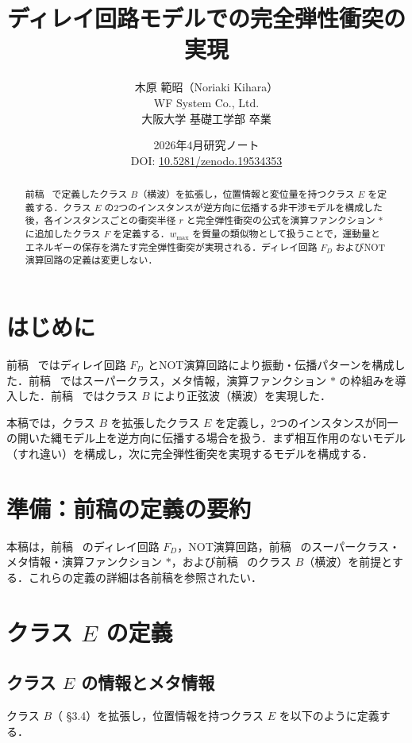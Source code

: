\documentclass[12pt,a4paper]{ltjsarticle}
\title{ディレイ回路モデルでの完全弾性衝突の実現}
\author{木原 範昭（Noriaki Kihara）\\
WF System Co., Ltd.\\
大阪大学 基礎工学部 卒業}
\date{2026年4月\quad 研究ノート\\[4pt]
DOI: \href{https://doi.org/10.5281/zenodo.19534353}{10.5281/zenodo.19534353}}
\begin{document}
\maketitle

\begin{abstract}
前稿~\cite{ref3} で定義したクラス $B$（横波）を拡張し，位置情報と変位量を持つクラス $E$ を定義する．クラス $E$ の2つのインスタンスが逆方向に伝播する非干渉モデルを構成した後，各インスタンスごとの衝突半径 $r$ と完全弾性衝突の公式を演算ファンクション $*$ に追加したクラス $F$ を定義する．$w_{\max}$ を質量の類似物として扱うことで，運動量とエネルギーの保存を満たす完全弾性衝突が実現される．ディレイ回路 $F_D$ およびNOT演算回路の定義は変更しない．
\end{abstract}

\section{はじめに}

前稿~\cite{ref1} ではディレイ回路 $F_D$ とNOT演算回路により振動・伝播パターンを構成した．前稿~\cite{ref2} ではスーパークラス，メタ情報，演算ファンクション $*$ の枠組みを導入した．前稿~\cite{ref3} ではクラス $B$ により正弦波（横波）を実現した．

本稿では，クラス $B$ を拡張したクラス $E$ を定義し，2つのインスタンスが同一の開いた縄モデル上を逆方向に伝播する場合を扱う．まず相互作用のないモデル（すれ違い）を構成し，次に完全弾性衝突を実現するモデルを構成する．

\section{準備：前稿の定義の要約}

本稿は，前稿~\cite{ref1} のディレイ回路 $F_D$，NOT演算回路，前稿~\cite{ref2} のスーパークラス・メタ情報・演算ファンクション $*$，および前稿~\cite{ref3} のクラス $B$（横波）を前提とする．これらの定義の詳細は各前稿を参照されたい．

\section{クラス $E$ の定義}

\subsection{クラス $E$ の情報とメタ情報}

クラス $B$（\cite{ref3} \S 3.4）を拡張し，位置情報を持つクラス $E$ を以下のように定義する．
\end{document}
